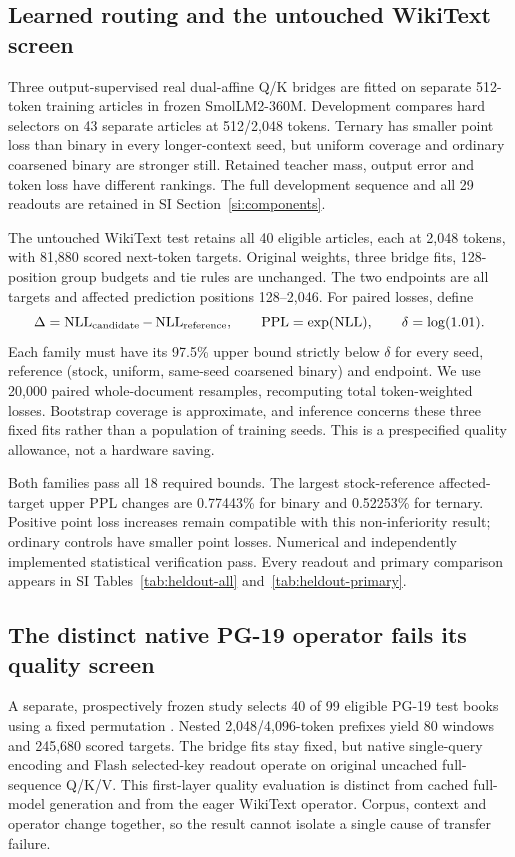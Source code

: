 \documentclass[11pt]{article}
\newcommand{\NLL}{\operatorname{NLL}}
\newcommand{\PPL}{\operatorname{PPL}}
\begin{document}
\subsection{Learned routing and the untouched WikiText screen}

Three output-supervised real dual-affine Q/K bridges are fitted on separate
512-token training articles in frozen SmolLM2-360M. Development compares
hard selectors on 43 separate articles at 512/2,048 tokens. Ternary has
smaller point loss than binary in every longer-context seed, but uniform
coverage and ordinary coarsened binary are stronger still. Retained teacher
mass, output error and token loss have different rankings. The full development
sequence and all 29 readouts are retained in SI Section~\ref{si:components}.

The untouched WikiText test retains all 40 eligible articles, each at 2,048
tokens, with 81,880 scored next-token targets. Original weights, three bridge
fits, 128-position group budgets and tie rules are unchanged. The two
endpoints are all targets and affected prediction positions 128--2,046.
For paired losses, define
\[
 \Delta=\NLL_{\rm candidate}-\NLL_{\rm reference},\qquad
 \PPL=\exp(\NLL),\qquad\delta=\log(1.01).
\]
Each family must have its 97.5\% upper bound strictly below \(\delta\) for
every seed, reference (stock, uniform, same-seed coarsened binary) and
endpoint. We use 20,000 paired whole-document resamples, recomputing total
token-weighted losses. Bootstrap coverage is approximate, and inference
concerns these three fixed fits rather than a population of training seeds.
This is a prespecified quality allowance, not a hardware saving.

Both families pass all 18 required bounds. The largest stock-reference
affected-target upper PPL changes are 0.77443\% for binary and 0.52253\%
for ternary. Positive point loss increases remain compatible with this
non-inferiority result; ordinary controls have smaller point losses.
Numerical and independently implemented statistical verification pass.
Every readout and primary comparison appears in SI
Tables~\ref{tab:heldout-all} and~\ref{tab:heldout-primary}.

\subsection{The distinct native PG-19 operator fails its quality screen}

A separate, prospectively frozen study selects 40 of 99 eligible PG-19 test
books using a fixed permutation \citep{pg19data}. Nested 2,048/4,096-token
prefixes yield 80 windows and 245,680 scored targets. The bridge fits stay
fixed, but native single-query encoding and Flash selected-key readout operate
on original uncached full-sequence Q/K/V. This first-layer quality evaluation
is distinct from cached full-model generation and from the eager WikiText
operator. Corpus, context and operator change together, so the result cannot
isolate a single cause of transfer failure.
\end{document}
